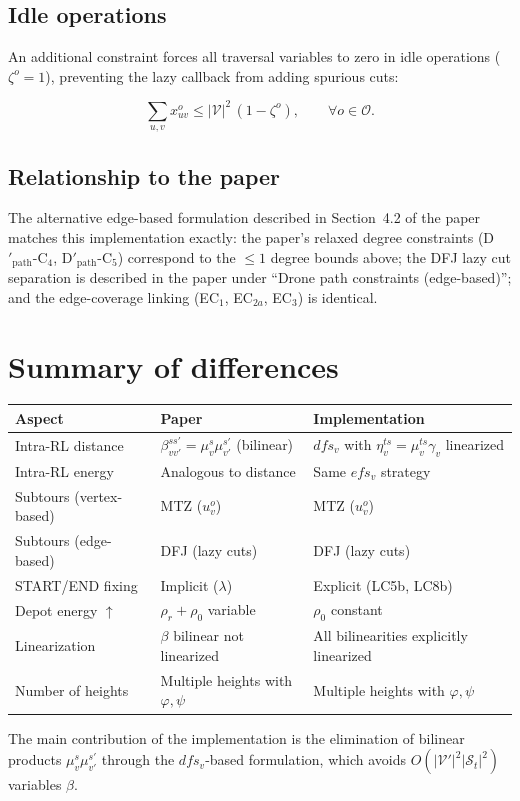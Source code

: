 \documentclass[12pt]{article}
\begin{document}
\subsection*{Idle operations}

An additional constraint forces all traversal variables to zero in idle
operations ($\zeta^o = 1$), preventing the lazy callback from adding
spurious cuts:

\begin{equation}
  \sum_{u,v} x_{uv}^o \le |\mathcal V|^2\,(1 - \zeta^o),
    \qquad \forall o\in\mathcal O. \tag{IDLE}
\end{equation}

\subsection*{Relationship to the paper}

The alternative edge-based formulation described in Section~4.2 of the paper
matches this implementation exactly: the paper's relaxed degree constraints
(D$'_{\text{path}}$-C$_4$, D$'_{\text{path}}$-C$_5$) correspond to the
$\le 1$ degree bounds above; the DFJ lazy cut separation is described in
the paper under ``Drone path constraints (edge-based)''; and the edge-coverage
linking (EC$_1$, EC$_{2a}$, EC$_3$) is identical.

\section{Summary of differences}

\begin{center}
\begin{tabular}{lll}
\toprule
Aspect & Paper & Implementation \\
\midrule
Intra-RL distance & $\beta_{vv'}^{ss'} = \mu_v^s \mu_{v'}^{s'}$ (bilinear) & $dfs_v$ with $\eta_v^{ts} = \mu_v^{ts}\gamma_v$ linearized \\
Intra-RL energy & Analogous to distance & Same $efs_v$ strategy \\
Subtours (vertex-based) & MTZ ($u_v^o$) & MTZ ($u_v^o$) \\
Subtours (edge-based)   & DFJ (lazy cuts)   & DFJ (lazy cuts)   \\
START/END fixing & Implicit ($\lambda$) & Explicit (LC5b, LC8b) \\
Depot energy $\uparrow$ & $\rho_r + \rho_0$ variable & $\rho_0$ constant \\
Linearization & $\beta$ bilinear not linearized & All bilinearities explicitly linearized \\
Number of heights & Multiple heights with $\varphi,\psi$ & Multiple heights with $\varphi,\psi$ \\
\bottomrule
\end{tabular}
\end{center}

The main contribution of the implementation is the elimination of
bilinear products $\mu_v^s\mu_{v'}^{s'}$ through the $dfs_v$-based
formulation, which avoids $O(|\mathcal V'|^2|\mathcal S_t|^2)$ variables $\beta$.
\end{document}
